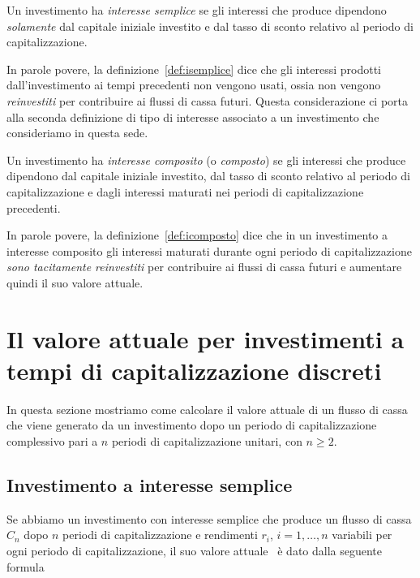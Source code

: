 \begin{defn}\label{def:isemplice}
  Un investimento ha \emph{interesse semplice} se gli interessi che produce dipendono \emph{solamente}
  dal capitale iniziale investito e dal tasso di sconto relativo al periodo di capitalizzazione.
\end{defn}

In parole povere, la definizione~\ref{def:isemplice} dice che gli interessi prodotti dall'investimento ai tempi
precedenti non vengono usati, ossia non vengono \emph{reinvestiti} per contribuire ai flussi di cassa futuri.
Questa considerazione ci porta alla seconda definizione di tipo di interesse associato a un investimento
che consideriamo in questa sede.

\begin{defn} \label{def:icomposto}
  Un investimento ha \emph{interesse composito} (o \emph{composto}) se gli interessi che produce dipendono
  dal capitale iniziale investito, dal tasso di sconto relativo al periodo di capitalizzazione e dagli interessi
  maturati nei periodi di capitalizzazione precedenti. 
\end{defn}

In parole povere, la definizione~\ref{def:icomposto} dice che in un investimento a interesse composito gli interessi
maturati durante ogni periodo di capitalizzazione \emph{sono tacitamente reinvestiti} per contribuire ai flussi di cassa
futuri e aumentare quindi il suo valore attuale.

\section[Capitalizzazione a tempi discreti]{Il valore attuale per investimenti a tempi di capitalizzazione discreti}
\label{sec:tdiscreti}

In questa sezione mostriamo come calcolare il valore attuale di un flusso di cassa che viene generato da un investimento 
dopo un periodo di capitalizzazione complessivo pari a $n$ periodi di capitalizzazione unitari, con $n\ge 2$.

\subsection{Investimento a interesse semplice}
\label{sec:isemplice_td}

Se abbiamo un investimento con interesse semplice che produce un flusso di cassa $C_n$ dopo $n$ periodi di capitalizzazione
e rendimenti $r_i$, $i= 1, \ldots, n$ variabili per ogni periodo di capitalizzazione, il suo valore attuale \VA\ è dato dalla
seguente formula

